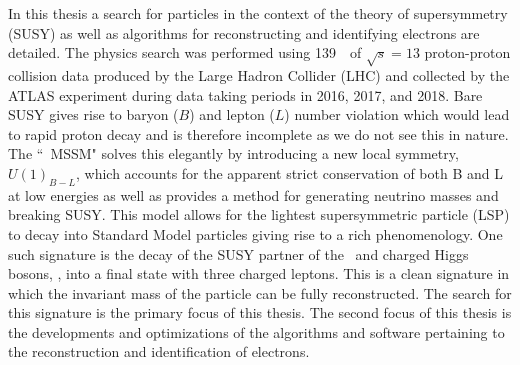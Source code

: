 In this thesis a search for particles in the context of the theory of supersymmetry (SUSY) as well as algorithms for reconstructing and identifying electrons are detailed.
The physics search was performed using 139~\ifb\ of $\sqrt{s}=13$ \tev proton-proton collision data produced by the Large Hadron Collider (LHC) and collected by the ATLAS experiment during data taking periods in 2016, 2017, and 2018.
Bare SUSY gives rise to baryon ($B$) and lepton ($L$) number violation which would lead to rapid proton decay and is therefore incomplete as we do not see this in nature. 
The ``\BL\ MSSM" solves this elegantly by introducing a new local symmetry, $U(1)_{B-L}$, which accounts for the apparent strict conservation of both B and L at low energies as well as provides a method for generating neutrino masses and breaking SUSY.  
This model allows for the lightest supersymmetric particle (LSP) to decay into Standard Model particles giving rise to a rich phenomenology. 
One such signature is the decay of the SUSY partner of the \Wboson\ and charged Higgs bosons, \chone, into a final state with three charged leptons.
This is a clean signature in which the invariant mass of the particle can be fully reconstructed. 
The search for this signature is the primary focus of this thesis.
The second focus of this thesis is the developments and optimizations of the algorithms and software pertaining to the reconstruction and identification of electrons.  
 
